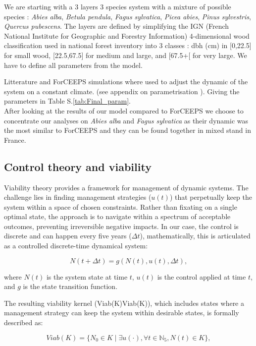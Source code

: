 \documentclass{article}
\begin{document}
We are starting with a 3 layers 3 species system with a mixture of possible species : \textit{Abies alba}, \textit{Betula pendula}, \textit{Fagus sylvatica}, \textit{Picea abies}, \textit{Pinus sylvestris}, \textit{Quercus pubescens}. The layers are defined by simplifying the IGN (French National Institute for Geographic and Forestry Information) 4-dimensional wood classification used in national forest inventory into 3 classes : dbh (cm) in [0,22.5] for small wood, [22.5,67.5] for medium and large, and [67.5+[ for very large. We have to define all parameters from the model.

Litterature and ForCEEPS simulations where used to adjust the dynamic of the system on a constant climate. (see appendix on parametrisation \autocite{bugmannEcologyMountainousForests1965,morinForestSuccessionGap2021}). Giving the parameters in Table S.\ref{tab:Final_param}.\\
After looking at the results of our model compared to ForCEEPS we choose to concentrate our analyses on \textit{Abies alba} and \textit{Fagus sylvatica} as their dynamic was the most similar to ForCEEPS and they can be found together in mixed stand in France.\\

\subsection{Control theory and viability}

Viability theory provides a framework for management of dynamic systems. The challenge lies in finding management strategies (\(u(t)\)) that perpetually keep the system within a space of chosen constraints. Rather than fixating on a single optimal state, the approach is to navigate within a spectrum of acceptable outcomes, preventing irreversible negative impacts.
In our case, the control is discrete and can happen every five years ($\Delta t$), mathematically, this is articulated as a controlled discrete-time dynamical system:

\[
N(t+\Delta t) = g(N(t), u(t), \Delta t),
\]

where \(N(t)\) is the system state at time \(t\), \(u(t)\) is the control applied at time \(t\), and \(g\) is the state transition function.

The resulting viability kernel (Viab(K)Viab(K)), which includes states where a management strategy can keep the system within desirable states, is formally described as:

\[
Viab(K) = \{N_0 \in K \mid\exists u(\cdot), \forall t \in \mathbb{N}_5, N(t) \in K\},
\]
\end{document}
